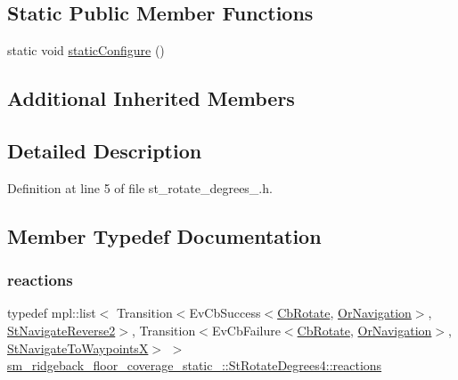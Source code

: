 \subsection*{Static Public Member Functions}
\begin{DoxyCompactItemize}
\item 
static void \hyperlink{structsm__ridgeback__floor__coverage__static__1_1_1StRotateDegrees4_ac005f396387ff36761815476ebf8c965}{static\+Configure} ()
\end{DoxyCompactItemize}
\subsection*{Additional Inherited Members}


\subsection{Detailed Description}


Definition at line 5 of file st\+\_\+rotate\+\_\+degrees\+\_.\+h.



\subsection{Member Typedef Documentation}
\mbox{\label{structsm__ridgeback__floor__coverage__static__1_1_1StRotateDegrees4_acc34071c53dec7d5b7a61250da3a23f6}} 
\subsubsection{\texorpdfstring{reactions}{reactions}}
{\footnotesize\ttfamily typedef mpl\+::list$<$ Transition$<$Ev\+Cb\+Success$<$\hyperlink{classcl__move__base__z_1_1CbRotate}{Cb\+Rotate}, \hyperlink{classsm__ridgeback__floor__coverage__static__1_1_1OrNavigation}{Or\+Navigation}$>$, \hyperlink{structsm__ridgeback__floor__coverage__static__1_1_1StNavigateReverse2}{St\+Navigate\+Reverse2}$>$, Transition$<$Ev\+Cb\+Failure$<$\hyperlink{classcl__move__base__z_1_1CbRotate}{Cb\+Rotate}, \hyperlink{classsm__ridgeback__floor__coverage__static__1_1_1OrNavigation}{Or\+Navigation}$>$, \hyperlink{structsm__ridgeback__floor__coverage__static__1_1_1StNavigateToWaypointsX}{St\+Navigate\+To\+WaypointsX}$>$ $>$ \hyperlink{structsm__ridgeback__floor__coverage__static__1_1_1StRotateDegrees4_acc34071c53dec7d5b7a61250da3a23f6}{sm\+\_\+ridgeback\+\_\+floor\+\_\+coverage\+\_\+static\+\_\+::\+St\+Rotate\+Degrees4\+::reactions}}



